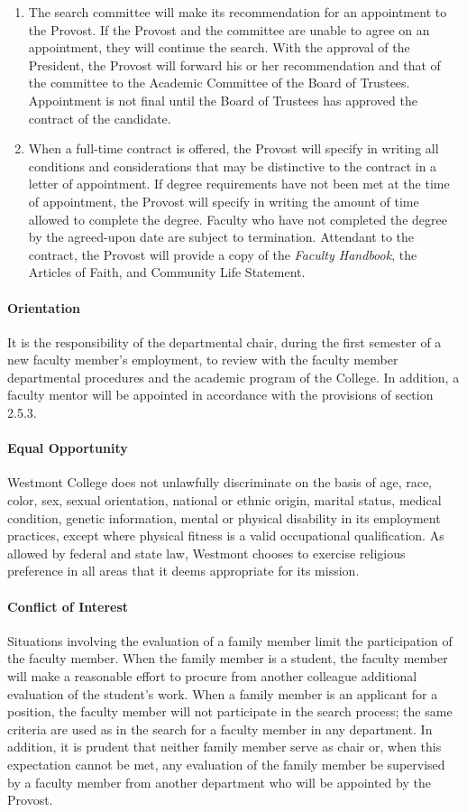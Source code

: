 \documentclass[letterpaper, 11pt]{article}
\begin{document}
				\begin{enumerate}[label=\alph*)]
					\item{The search committee will make its recommendation for an appointment to the Provost.  If the Provost and the committee are unable to agree on an appointment, they will continue the search.  With the approval of the President, the Provost will forward his or her recommendation and that of the committee to the Academic Committee of the Board of Trustees.  Appointment is not final until the Board of Trustees has approved the contract of the candidate.}
					\item{When a full-time contract is offered, the Provost will specify in writing all conditions and considerations that may be distinctive to the contract in a letter of appointment.  If degree requirements have not been met at the time of appointment, the Provost will specify in writing the amount of time allowed to complete the degree.  Faculty who have not completed the degree by the agreed-upon date are subject to termination.  Attendant to the contract, the Provost will provide a copy of the \emph{Faculty Handbook}, the Articles of Faith, and Community Life Statement.}
				\end{enumerate}
			\paragraph{Orientation}
				It is the responsibility of the departmental chair, during the first semester of a new faculty member's employment, to review with the faculty member departmental procedures and the academic program of the College.  In addition, a faculty mentor will be appointed in accordance with the provisions of section 2.5.3.
			\paragraph{Equal Opportunity}
				Westmont College does not unlawfully discriminate on the basis of age, race, color, sex, sexual orientation, national or ethnic origin, marital status, medical condition, genetic information, mental or physical disability in its employment practices, except where physical fitness is a valid occupational qualification. As allowed by federal and state law, Westmont chooses to exercise religious preference in all areas that it deems appropriate for its mission.
			\paragraph{Conflict of Interest}
				Situations involving the evaluation of a family member limit the participation of the faculty member.  When the family member is a student, the faculty member will make a reasonable effort to procure from another colleague additional evaluation of the student's work.  When a family member is an applicant for a position, the faculty member will not participate in the search process; the same criteria are used as in the search for a faculty member in any department.  In addition, it is prudent that neither family member serve as chair or, when this expectation cannot be met, any evaluation of the family member be supervised by a faculty member from another department who will be appointed by the Provost.
\end{document}
